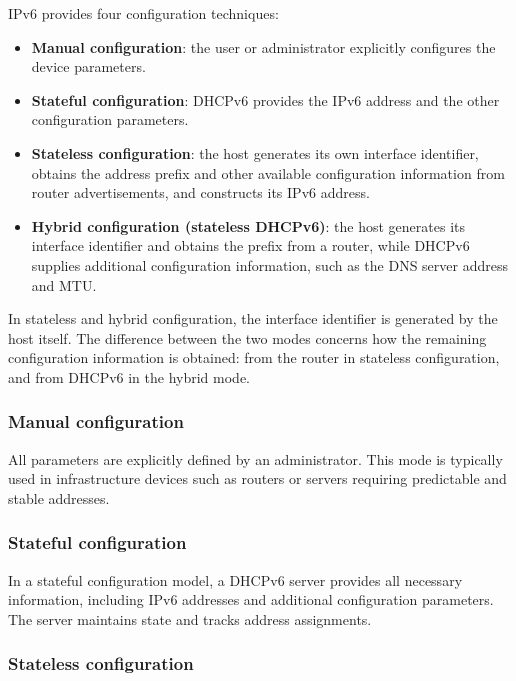 \documentclass[11pt,a4paper,openany]{report}
\begin{document}
IPv6 provides four configuration techniques:

\begin{itemize}
	\item \textbf{Manual configuration}: the user or administrator
	explicitly configures the device parameters.
	\item \textbf{Stateful configuration}: DHCPv6 provides the IPv6 address
	and the other configuration parameters.
	\item \textbf{Stateless configuration}: the host generates its own
	interface identifier, obtains the address prefix and other available
	configuration information from router advertisements, and constructs
	its IPv6 address.
	\item \textbf{Hybrid configuration (stateless DHCPv6)}: the host
	generates its interface identifier and obtains the prefix from a
	router, while DHCPv6 supplies additional configuration information,
	such as the DNS server address and MTU.
\end{itemize}

In stateless and hybrid configuration, the interface identifier is
generated by the host itself. The difference between the two modes
concerns how the remaining configuration information is obtained:
from the router in stateless configuration, and from DHCPv6 in the
hybrid mode.

\subsubsection*{Manual configuration}

All parameters are explicitly defined by an administrator. This mode is typically used in infrastructure devices such as routers or servers requiring predictable and stable addresses.

\subsubsection*{Stateful configuration}

In a stateful configuration model, a DHCPv6 server provides all necessary information, including IPv6 addresses and additional configuration parameters. The server maintains state and tracks address assignments.

\subsubsection*{Stateless configuration}
\end{document}
